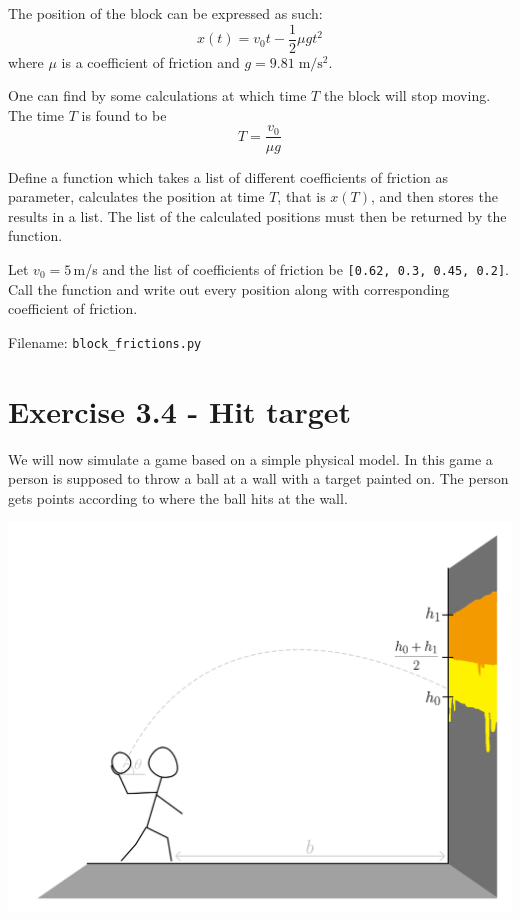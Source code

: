 \documentclass[10pt,a4paper]{article}
\begin{document}
	The position of the block can be expressed as such:
	\[
		x(t) = v_0t - \frac{1}{2}\mu g t^2
	\]
	where $\mu$ is a coefficient of friction and $g = 9.81\;\mathrm{m/s^2}$.
	
	One can find by some calculations at which time $T$ the block will stop moving. The time $T$ is found to be
	\[
	T = \frac{v_0}{\mu g}
	\]
	
	Define a function which takes a list of different coefficients of friction as parameter, calculates the position at time $T$, that is $x(T)$, and then stores the results in a list. The list of the calculated positions must then be returned by the function. 
		
		Let $v_0 = 5\,$m/s and the list of coefficients of friction be \texttt{[0.62, 0.3, 0.45, 0.2]}. Call the function and write out every position along with corresponding coefficient of friction.
	
	Filename: \texttt{block\_frictions.py}

	
	\section*{Exercise 3.4 - Hit target}
	We will now simulate a game based on a simple physical model. 
	In this game a person is supposed to throw a ball at a wall with a target painted on. The person gets points according to where the ball hits at the wall.
	\begin{center}
	\includegraphics{fig_tegning_33-cp1.png}
	\end{center}
\end{document}
